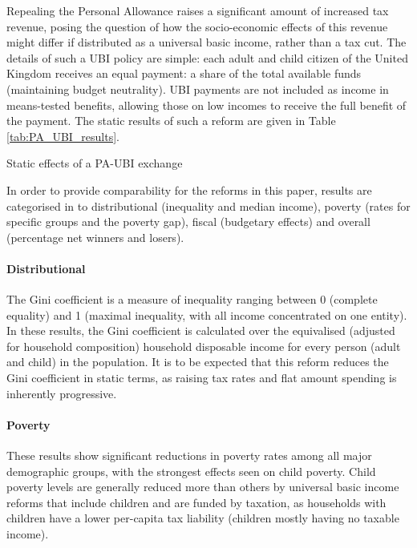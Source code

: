 \documentclass{article}
\begin{document}
    Repealing the Personal Allowance raises a significant amount of increased tax revenue, posing the question of how the socio-economic effects of this revenue might differ if distributed as a universal basic income, rather than a tax cut. The details of such a UBI policy are simple: each adult and child citizen of the United Kingdom receives an equal payment: a share of the total available funds (maintaining budget neutrality). UBI payments are not included as income in means-tested benefits, allowing those on low incomes to receive the full benefit of the payment. The static results of such a reform are given in Table \ref{tab:PA_UBI_results}.
    \begin{table}
        \centering
        
        \caption{Static effects of a PA-UBI exchange}
        \label{tab:PA_UBI_results}
    \end{table}
    
    In order to provide comparability for the reforms in this paper, results are categorised in to distributional (inequality and median income), poverty (rates for specific groups and the poverty gap), fiscal (budgetary effects) and overall (percentage net winners and losers). 
    
    \paragraph{Distributional} The Gini coefficient is a measure of inequality ranging between 0 (complete equality) and 1 (maximal inequality, with all income concentrated on one entity). In these results, the Gini coefficient is calculated over the equivalised (adjusted for household composition) household disposable income for every person (adult and child) in the population. It is to be expected that this reform reduces the Gini coefficient in static terms, as raising tax rates and flat amount spending is inherently progressive.
    
    \paragraph{Poverty} These results show significant reductions in poverty rates among all major demographic groups, with the strongest effects seen on child poverty. Child poverty levels are generally reduced more than others by universal basic income reforms that include children and are funded by taxation, as households with children have a lower per-capita tax liability (children mostly having no taxable income). 
    
\end{document}
